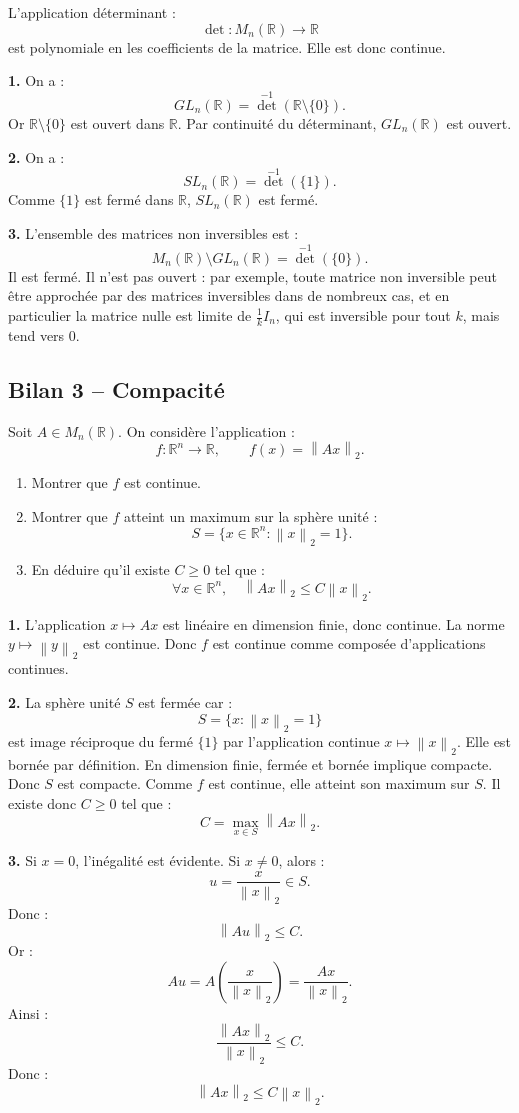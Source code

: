 \documentclass[11pt,a4paper]{article}
\newcommand{\R}{\mathbb R}
\newcommand{\norme}[1]{\left\lVert #1 \right\rVert}
\begin{document}
\begin{correctionbox}[Bilan 2]
L'application déterminant :
\[
\det:M_n(\R)\to\R
\]
est polynomiale en les coefficients de la matrice. Elle est donc continue.

\textbf{1.}  
On a :
\[
GL_n(\R)=\det^{-1}(\R\setminus\{0\}).
\]
Or \(\R\setminus\{0\}\) est ouvert dans \(\R\).  
Par continuité du déterminant, \(GL_n(\R)\) est ouvert.

\textbf{2.}  
On a :
\[
SL_n(\R)=\det^{-1}(\{1\}).
\]
Comme \(\{1\}\) est fermé dans \(\R\), \(SL_n(\R)\) est fermé.

\textbf{3.}  
L'ensemble des matrices non inversibles est :
\[
M_n(\R)\setminus GL_n(\R)=\det^{-1}(\{0\}).
\]
Il est fermé.  
Il n'est pas ouvert : par exemple, toute matrice non inversible peut être approchée par des matrices inversibles dans de nombreux cas, et en particulier la matrice nulle est limite de \(\frac1k I_n\), qui est inversible pour tout \(k\), mais tend vers \(0\).
\end{correctionbox}

\subsection*{Bilan 3 -- Compacité}

\begin{exercicebox}[Bilan 3]
Soit \(A\in M_n(\R)\). On considère l'application :
\[
f:\R^n\to\R,\qquad f(x)=\norme{Ax}_2.
\]

\begin{enumerate}
    \item Montrer que \(f\) est continue.
    \item Montrer que \(f\) atteint un maximum sur la sphère unité :
    \[
    S=\{x\in\R^n:\norme{x}_2=1\}.
    \]
    \item En déduire qu'il existe \(C\geq0\) tel que :
    \[
    \forall x\in\R^n,\quad \norme{Ax}_2\leq C\norme{x}_2.
    \]
\end{enumerate}
\end{exercicebox}

\begin{correctionbox}[Bilan 3]
\textbf{1.}  
L'application \(x\mapsto Ax\) est linéaire en dimension finie, donc continue.  
La norme \(y\mapsto\norme{y}_2\) est continue.  
Donc \(f\) est continue comme composée d'applications continues.

\textbf{2.}  
La sphère unité \(S\) est fermée car :
\[
S=\{x:\norme{x}_2=1\}
\]
est image réciproque du fermé \(\{1\}\) par l'application continue \(x\mapsto\norme{x}_2\).  
Elle est bornée par définition.  
En dimension finie, fermée et bornée implique compacte.  
Donc \(S\) est compacte.  
Comme \(f\) est continue, elle atteint son maximum sur \(S\).  
Il existe donc \(C\geq0\) tel que :
\[
C=\max_{x\in S} \norme{Ax}_2.
\]

\textbf{3.}  
Si \(x=0\), l'inégalité est évidente.  
Si \(x\neq0\), alors :
\[
u=\frac{x}{\norme{x}_2}\in S.
\]
Donc :
\[
\norme{Au}_2\leq C.
\]
Or :
\[
Au=A\left(\frac{x}{\norme{x}_2}\right)=\frac{Ax}{\norme{x}_2}.
\]
Ainsi :
\[
\frac{\norme{Ax}_2}{\norme{x}_2}\leq C.
\]
Donc :
\[
\norme{Ax}_2\leq C\norme{x}_2.
\]
\end{correctionbox}
\end{document}
